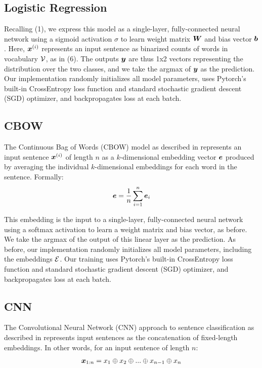 \documentclass[11pt]{article}
\begin{document}
\subsection{Logistic Regression}

Recalling (1), we express this model as a single-layer, fully-connected neural network using a sigmoid activation $\sigma$ to learn weight matrix $\boldsymbol{W}$ and bias vector $\boldsymbol{b}$. Here, $\boldsymbol{x}^{(i)}$ represents an input sentence as binarized counts of words in vocabulary $\mathcal{V}$, as in (6). The outputs $\boldsymbol{y}$ are thus 1x2 vectors representing the distribution over the two classes, and we take the argmax of $\boldsymbol{y}$ as the prediction. Our implementation randomly initializes all model parameters, uses Pytorch's built-in CrossEntropy loss function and standard stochastic gradient descent (SGD) optimizer, and backpropagates loss at each batch.

\subsection{CBOW}

The Continuous Bag of Words (CBOW) model as described in \citep{mikolov2013efficient} represents an input sentence $\boldsymbol{x}^{(i)}$ of length $n$ as a $k$-dimensional embedding vector $\boldsymbol{e}$ produced by averaging the individual $k$-dimensional embeddings for each word in the sentence. Formally:
\begin{align}
  \boldsymbol{e} = \frac{1}{n} \sum_{i=1}^{n} \boldsymbol{e}_i
\end{align}

This embedding is the input to a single-layer, fully-connected neural network using a softmax activation to learn a weight matrix and bias vector, as before. We take the argmax of the output of this linear layer as the prediction. As before, our implementation randomly initializes all model parameters, including the embeddings $\mathcal{E}$. Our training uses Pytorch's built-in CrossEntropy loss function and standard stochastic gradient descent (SGD) optimizer, and backpropagates loss at each batch.


\subsection{CNN}

The Convolutional Neural Network (CNN) approach to sentence classification as described in \cite{kim2014convolutional} represents input sentences as the concatenation of fixed-length embeddings. In other words, for an input sentence of length $n$:
\begin{align}
  \boldsymbol{x}_{1:n} = x_1 \oplus x_2 \oplus ... \oplus x_{n-1} \oplus x_n
\end{align}
\end{document}
